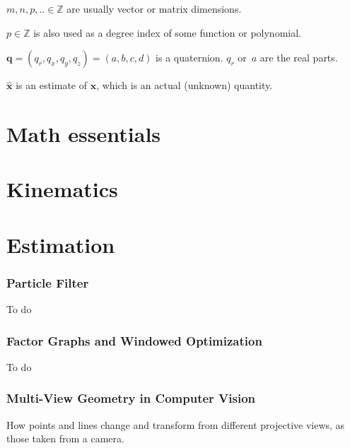 \documentclass[a4paper,11pt]{article}
\begin{document}
$m,n,p,.. \in \mathbb{Z}$ are usually vector or matrix dimensions.

$p \in \mathbb{Z}$ is also used as a degree index of some function or polynomial. 

$\mathbf{q} = (q_r,q_x,q_y,q_z) = (a,b,c,d)$ is a quaternion. $q_r$ or~$a$ are the real parts.

$\hat{\mathbf{x}}$ is an estimate of $\mathbf{x}$, which is an actual (unknown) quantity.

\newpage
\part{Math essentials}

\newpage


\newpage


\newpage


\newpage


\newpage


\newpage


\newpage


\newpage
\part{Kinematics}

\newpage


\newpage
\part{Estimation}

\newpage



\newpage


\newpage
\section{Particle Filter}
To do

\newpage
\section{Factor Graphs and Windowed Optimization}
To do

\newpage
\section{Multi-View Geometry in Computer Vision}
How points and lines change and transform from different projective views, as those taken from a camera.
\end{document}
